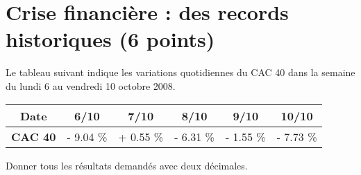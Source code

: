 \section{Crise financière : des records historiques (6 points)}

Le tableau suivant indique les variations quotidiennes du CAC 40 dans la semaine du lundi 6 au vendredi 10 octobre 2008.

\begin{center}
	\begin{tabular}{|@{\ }c@{\ }|@{\ }c@{\ }|@{\ }c@{\ }|@{\ }c@{\ }|@{\ }c@{\ }|@{\ }c@{\ }|}
		\hline
		\textbf{Date}   & \textbf{6/10}   & \textbf{7/10}   & \textbf{8/10}   & \textbf{9/10}  & \textbf{10/10} \\ \hline
		\textbf{CAC 40} & - \num{9.04} \% & + \num{0.55} \% & - \num{6.31} \% & - \num{1.55} \% & - \num{7.73} \%  \\ \hline
	\end{tabular}
\end{center}

Donner tous les résultats demandés avec deux décimales.

